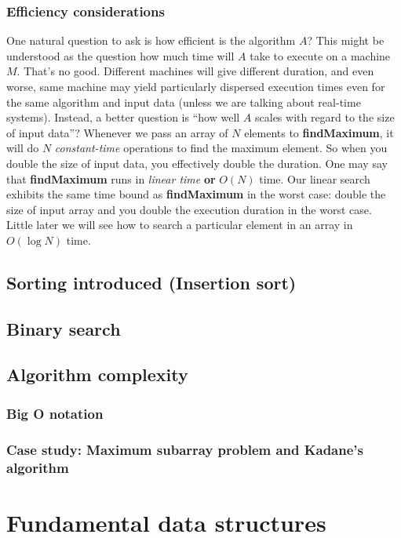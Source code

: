 \documentclass[oneside]{book}
\begin{document}
\subsection{Efficiency considerations}
One natural question to ask is how efficient is the algorithm $A$? This might be understood as the question how much time will $A$ take to execute on a machine $M$. That's no good. Different machines will give different duration, and even worse, same machine may yield particularly dispersed execution times even for the same algorithm and input data (unless we are talking about real-time systems). Instead, a better question is ``how well $A$ scales with regard to the size of input data''? Whenever we pass an array of $N$ elements to \textbf{findMaximum}, it will do $N$ \textit{constant-time} operations to find the maximum element. So when you double the size of input data, you effectively double the duration. One may say that \textbf{findMaximum} runs in \textit{linear time} \textbf{or} $O(N)$ time. Our linear search exhibits the same time bound as \textbf{findMaximum} in the worst case: double the size of input array and you double the execution duration in the worst case. Little later we will see how to search a particular element in an array in $O(\log N)$ time.

\section{Sorting introduced (Insertion sort)}

\section{Binary search}

\section{Algorithm complexity}

\subsection{Big O notation}

\subsection{Case study: Maximum subarray problem and Kadane's algorithm}

\chapter{Fundamental data structures}
\end{document}
